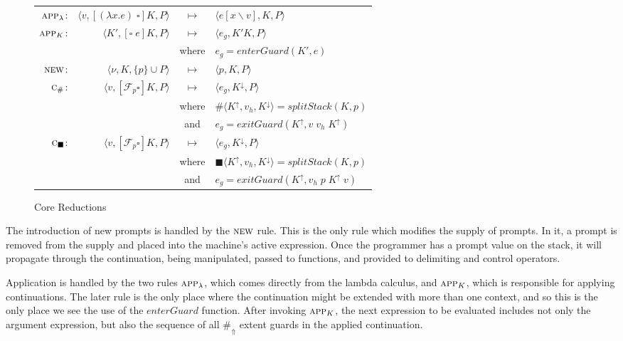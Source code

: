\documentclass[11pt]{article}
\newcommand\F{\mathcal{F}}
\newcommand{\angles}[1]{\langle#1\rangle}
\begin{document}
\begin{figure}[H]
\caption{Core Reductions}
\label{fig:interpreter-core}
\begin{tabular}{rrcl}
$\textsc{app}_\lambda$: &
	$\angles{v, [(\lambda x.e)\;\square]K,P}$ & $\longmapsto$ &
	$\angles{e[x\backslash v],K,P}$ \\
$\textsc{app}_K$: &
	$\angles{K', [\square\;e]K,P}$ & $\longmapsto$ &
	$\angles{e_g,K'K,P}$ \\
	&& where & $e_g = enterGuard(K',e)$ \\
$\textsc{new}$: &
	$\angles{\nu, K, \{p\} \cup P}$ & $\longmapsto$ &
	$\angles{p,K,P}$ \\
$\textsc{c}_\#$: &
	$\angles{v, [\F_p\square]K, P}$ & $\longmapsto$ &
	$\angles{e_g, K^\downarrow,P}$ \\
	&& where & $\#\angles{K^\uparrow, v_h, K^\downarrow} = splitStack(K,p)$ \\
	&& and & $e_g = exitGuard(K^\uparrow,v\;v_h\;K^\uparrow)$ \\
$\textsc{c}_\blacksquare$: &
	$\angles{v, [\F_p\square]K, P}$ & $\longmapsto$ &
	$\angles{e_g, K^\downarrow,P}$ \\
	&& where & $\blacksquare\angles{K^\uparrow, v_h, K^\downarrow} = splitStack(K,p)$ \\
	&& and & $e_g = exitGuard(K^\uparrow, v_h\;p\;K^\uparrow\;v)$ \\
\end{tabular}
\end{figure}



The introduction of new prompts is handled by the $\textsc{new}$ rule.
This is the only rule which modifies the supply of prompts.
In it, a prompt is removed from the supply and placed into the machine's active expression.
Once the programmer has a prompt value on the stack, it will propagate through the continuation, being manipulated, passed to functions, and provided to delimiting and control operators.

Application is handled by the two rules $\textsc{app}_\lambda$, which comes directly from the lambda calculus, and $\textsc{app}_K$, which is responsible for applying continuations.
The later rule is the only place where the continuation might be extended with more than one context, and so this is the only place we see the use of the $enterGuard$ function.
After invoking $\textsc{app}_K$, the next expression to be evaluated includes not only the argument expression, but also the sequence of all $\#_\Uparrow$ extent guards in the applied continuation.
\end{document}
